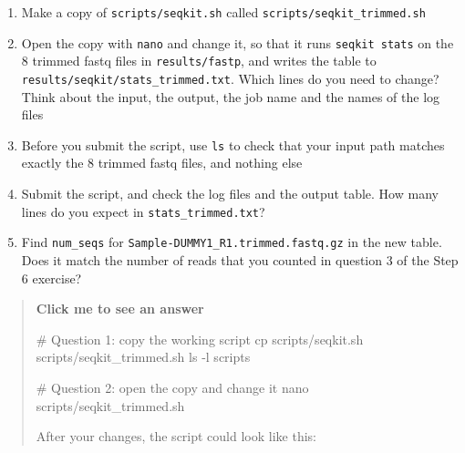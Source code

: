 \documentclass[
  letterpaper,
  DIV=11,
  numbers=noendperiod]{scrreprt}
\newenvironment{Shaded}{}{}
\newcommand{\AttributeTok}[1]{\textcolor[rgb]{0.84,0.23,0.29}{#1}}
\newcommand{\CommentTok}[1]{\textcolor[rgb]{0.42,0.45,0.49}{#1}}
\newcommand{\FunctionTok}[1]{\textcolor[rgb]{0.44,0.26,0.76}{#1}}
\newcommand{\NormalTok}[1]{\textcolor[rgb]{0.14,0.16,0.18}{#1}}
\providecommand{\tightlist}{%
  \setlength{\itemsep}{0pt}\setlength{\parskip}{0pt}}
\begin{document}
\begin{tcolorbox}[enhanced jigsaw, colbacktitle=quarto-callout-color!10!white, rightrule=.15mm, leftrule=.75mm, colback=white, opacitybacktitle=0.6, title=\textcolor{quarto-callout-color}{\faInfo}\hspace{0.5em}{Exercise}, bottomrule=.15mm, left=2mm, colframe=quarto-callout-color-frame, opacityback=0, breakable, bottomtitle=1mm, coltitle=black, arc=.35mm, toprule=.15mm, toptitle=1mm, titlerule=0mm]

\begin{enumerate}
\def\labelenumi{\arabic{enumi}.}
\tightlist
\item
  Make a copy of \texttt{scripts/seqkit.sh} called
  \texttt{scripts/seqkit\_trimmed.sh}
\item
  Open the copy with \texttt{nano} and change it, so that it runs
  \texttt{seqkit\ stats} on the 8 trimmed fastq files in
  \texttt{results/fastp}, and writes the table to
  \texttt{results/seqkit/stats\_trimmed.txt}. Which lines do you need to
  change? Think about the input, the output, the job name and the names
  of the log files
\item
  Before you submit the script, use \texttt{ls} to check that your input
  path matches exactly the 8 trimmed fastq files, and nothing else
\item
  Submit the script, and check the log files and the output table. How
  many lines do you expect in \texttt{stats\_trimmed.txt}?
\item
  Find \texttt{num\_seqs} for
  \texttt{Sample-DUMMY1\_R1.trimmed.fastq.gz} in the new table. Does it
  match the number of reads that you counted in question 3 of the Step 6
  exercise?
\end{enumerate}

\begin{quote}
\textbf{Click me to see an answer}

\begin{Shaded}
\begin{Highlighting}[]
\CommentTok{\# Question 1: copy the working script}
\FunctionTok{cp}\NormalTok{ scripts/seqkit.sh scripts/seqkit\_trimmed.sh}
\FunctionTok{ls} \AttributeTok{{-}l}\NormalTok{ scripts}

\CommentTok{\# Question 2: open the copy and change it}
\FunctionTok{nano}\NormalTok{ scripts/seqkit\_trimmed.sh}
\end{Highlighting}
\end{Shaded}

After your changes, the script could look like this:


\end{quote}
\end{tcolorbox}
\end{document}
